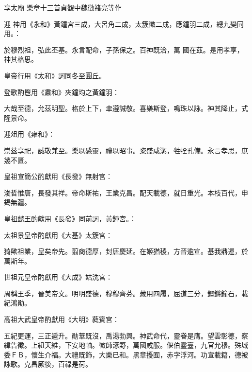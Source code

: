 
\begin{pinyinscope}

 享太廟
 樂章十三首貞觀中魏徵褚亮等作



 迎
 神用《永和》黃鐘宮三成，大呂角二成，太簇徵二成，應鐘羽二成，總九變同用。：



 於穆烈祖，弘此丕基。永言配命，子孫保之。百神既洽，萬
 國在茲。是用孝享，神其格思。



 皇帝行用《太和》詞同冬至圓丘。



 登歌酌鬯用《肅和》夾鐘均之黃鐘羽：



 大哉至德，允茲明聖。格於上下，聿遵誠敬。喜樂斯登，鳴珠以詠。神其降止，式隆景命。



 迎俎用《雍和》：



 崇茲享祀，誠敬兼至。樂以感靈，禮以昭事。粢盛咸潔，牲牷孔備。永言孝思，庶幾不匱。



 皇祖宣簡公酌獻用《長發》無射宮：



 浚哲惟唐，長發其祥。帝命斯祐，王業克昌。配天載德，就日重光。本枝百代，申錫無疆。



 皇祖懿王酌獻用《長發》同前詞，黃鐘宮。：



 太祖景皇帝酌獻用《大基》太簇宮：



 猗歟祖業，皇矣帝先。翦商德厚，封唐慶延。在姬猶稷，方晉逾宣。基我鼎運，於萬斯年。



 世祖元皇帝酌獻用《大成》姑洗宮：



 周稱王季，晉美帝文。明明盛德，穆穆齊芬。藏用四履，屈道三分，鏗鏘鐘石，載紀鴻勛。



 高祖大武皇帝酌獻用《大明》蕤賓宮：



 五紀更運，三正遞升。勛華既沒，禹湯勃興。神武命代，靈眷是膺。望雲彰德，察緯告徵。上紐天維，下安地軸。徵師涿野，萬國咸服。偃伯靈臺，九官允穆。殊域委ＦＢ，懷生介福。大禮既飾，大樂已和。黑章擾囿，赤字浮河。功宣載籍，德被詠歌。克昌厥後，百祿是荷。




\end{pinyinscope}
